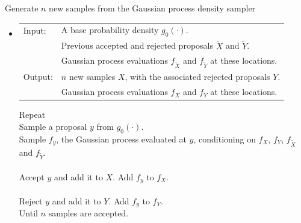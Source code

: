 {
\begin{algo}
{Generate $n$ new samples from the Gaussian process density sampler}\label{alg:gpds}
\begin{itemize}
  \item[]
\begin{tabular}{p{.9cm}p{12.2cm}}
{Input:}  & A base probability density $g_0(\cdot)$. \\
                 & Previous accepted and rejected proposals $\tilde{X}$ and $\tilde{Y}$. \\
                 & Gaussian process evaluations $f_{\tilde{X}}$ and $f_{\tilde{Y}}$ at these locations. \\
{Output:} & $n$ new samples $X$, with the associated rejected proposals $Y$. \\ %
                 & Gaussian process evaluations $f_X$ and $f_Y$ at these locations. \\
\end{tabular}
\vspace*{-8pt}
\begin{tabbing}
  \enspace Repeat \\
  \qquad Sample a proposal $y$ from $g_0(\cdot)$. \\
  \qquad Sample $f_y$, the Gaussian process evaluated at $y$, conditioning on $f_X$, $f_Y$, $f_{\tilde{X}}$ and $f_{\tilde{Y}}$. \\ %
   \\
  \qquad \qquad Accept $y$ and add it to $X$. Add $f_y$ to $f_X$.\\
   \\
  \qquad  \qquad Reject $y$ and add it to $Y$. Add $f_y$ to $f_Y$.\\
  \enspace Until {$n$ samples are accepted}.
\end{tabbing}
\end{itemize}
\end{algo}
}



